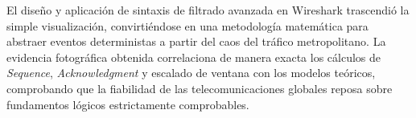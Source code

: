 \documentclass[conference]{IEEEtran}
\begin{document}
El diseño y aplicación de sintaxis de filtrado avanzada en Wireshark trascendió la simple visualización, convirtiéndose en una metodología matemática para abstraer eventos deterministas a partir del caos del tráfico metropolitano. La evidencia fotográfica obtenida correlaciona de manera exacta los cálculos de \textit{Sequence}, \textit{Acknowledgment} y escalado de ventana con los modelos teóricos, comprobando que la fiabilidad de las telecomunicaciones globales reposa sobre fundamentos lógicos estrictamente comprobables.

\renewcommand{\refname}{Referencias}


\end{document}
